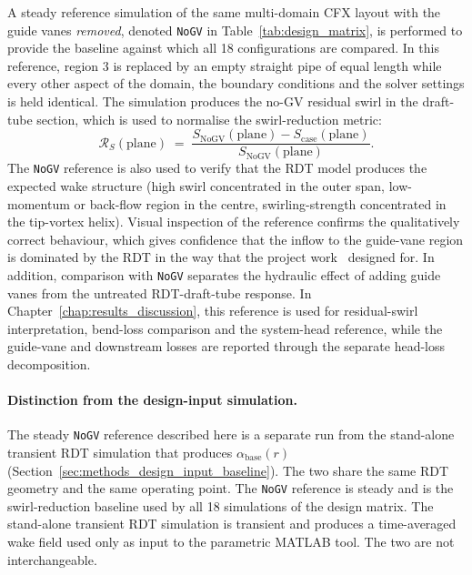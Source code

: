 A steady reference simulation of the same multi-domain CFX layout with the guide vanes \emph{removed}, denoted \texttt{NoGV} in Table~\ref{tab:design_matrix}, is performed to provide the baseline against which all 18 configurations are compared. In this reference, region 3 is replaced by an empty straight pipe of equal length while every other aspect of the domain, the boundary conditions and the solver settings is held identical. The simulation produces the no-GV residual swirl in the draft-tube section, which is used to normalise the swirl-reduction metric:
\begin{equation}
\mathcal{R}_S(\mathrm{plane}) \;=\; \frac{S_{\mathrm{NoGV}}(\mathrm{plane}) - S_{\mathrm{case}}(\mathrm{plane})}{S_{\mathrm{NoGV}}(\mathrm{plane})}.
\label{eq:swirl_reduction}
\end{equation}
The \texttt{NoGV} reference is also used to verify that the RDT model produces the expected wake structure (high swirl concentrated in the outer span, low-momentum or back-flow region in the centre, swirling-strength concentrated in the tip-vortex helix). Visual inspection of the reference confirms the qualitatively correct behaviour, which gives confidence that the inflow to the guide-vane region is dominated by the RDT in the way that the project work~\cite{Leonsen2025} designed for. In addition, comparison with \texttt{NoGV} separates the hydraulic effect of adding guide vanes from the untreated RDT-draft-tube response. In Chapter~\ref{chap:results_discussion}, this reference is used for residual-swirl interpretation, bend-loss comparison and the system-head reference, while the guide-vane and downstream losses are reported through the separate head-loss decomposition.

\paragraph{Distinction from the design-input simulation.}
The steady \texttt{NoGV} reference described here is a separate run from the stand-alone transient RDT simulation that produces $\alpha_{\mathrm{base}}(r)$ (Section~\ref{sec:methods_design_input_baseline}). The two share the same RDT geometry and the same operating point. The \texttt{NoGV} reference is steady and is the swirl-reduction baseline used by all 18 simulations of the design matrix. The stand-alone transient RDT simulation is transient and produces a time-averaged wake field used only as input to the parametric MATLAB tool. The two are not interchangeable.
 

